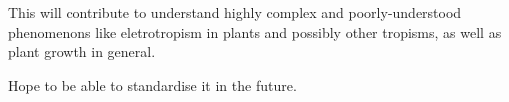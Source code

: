 This will contribute to understand highly complex and poorly-understood phenomenons like eletrotropism in plants and possibly other tropisms, as well as plant growth in general.

%


Hope to be able to standardise it in the future.

%
%
%
%
%
%
%
%
%
%
%
%
% 
%
%
%


